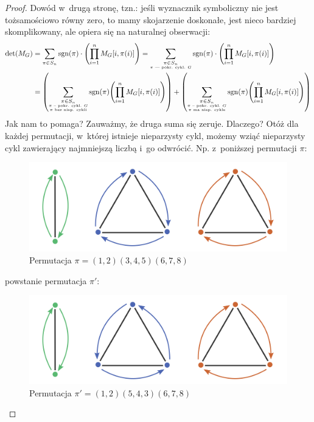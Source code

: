 \begin{proof}
	Dowód w~drugą stronę, tzn.: jeśli wyznacznik symboliczny nie jest tożsamościowo równy zero, to mamy skojarzenie  doskonałe, jest nieco bardziej skomplikowany, ale opiera się na naturalnej obserwacji:
	\begin{equation*}
		\begin{split}
			\det\pars{M_G}
			&= \sum_{\pi \in S_n}\sgn\pars{\pi} \cdot \pars{\prod_{i = 1}^{n}M_G[i, \pi\pars{i}]}
			= \sum_{\substack{\pi \in S_n\\\text{\tiny $\pi$ --- pokr. cykl. $G$}}}\sgn\pars{\pi} \cdot \pars{\prod_{i = 1}^{n}M_G[i, \pi\pars{i}]}\\
			&= \pars{\sum_{\substack{\pi \in S_n\\\text{\tiny $\pi$ -- pokr. cykl. $G$}\\\text{\tiny $\pi$ bez niep. cykli}}}\sgn\pars{\pi}\pars{\prod_{i = 1}^{n}M_G[i, \pi\pars{i}]}} + \pars{\sum_{\substack{\pi \in S_n\\\text{\tiny $\pi$ -- pokr. cykl. $G$}\\\text{\tiny $\pi$ ma niep. cykle}}}\sgn\pars{\pi}\pars{\prod_{i = 1}^{n}M_G[i, \pi\pars{i}]}}
		\end{split}
	\end{equation*}
	Jak nam to pomaga? Zauważmy, że druga suma się zeruje. Dlaczego? Otóż dla każdej permutacji, w~której istnieje nieparzysty cykl, możemy wziąć nieparzysty cykl zawierający najmniejszą liczbą i~go odwrócić. Np. z~poniższej permutacji $\pi$:

	\begin{figure}[H]
		\centering
		\includegraphics[scale=0.5]{images/tutte/pre_switching.png}
		\caption{Permutacja $\pi = (1, 2)(3, 4, 5)(6, 7, 8)$}
	\end{figure}

	powstanie permutacja $\pi'$:

	\begin{figure}[H]
		\centering
		\includegraphics[scale=0.5]{images/tutte/post_switching.png}
		\caption{Permutacja $\pi' = (1, 2)(5, 4, 3)(6, 7, 8)$}
	\end{figure}


\end{proof}

